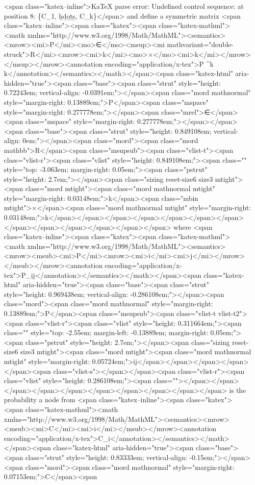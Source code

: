<span class="katex--inline">KaTeX parse error: Undefined control sequence: \hdots at position 8: \{C_1, \̲h̲d̲o̲t̲s̲, C_k\}</span> and define a symmetric matrix <span class="katex--inline"><span class="katex"><span class="katex-mathml"><math xmlns="http://www.w3.org/1998/Math/MathML"><semantics><mrow><mi>P</mi><mo>∈</mo><msup><mi mathvariant="double-struck">R</mi><mrow><mi>k</mi><mo>×</mo><mi>k</mi></mrow></msup></mrow><annotation encoding="application/x-tex">P \in {}^{k \times k}</annotation></semantics></math></span><span class="katex-html" aria-hidden="true"><span class="base"><span class="strut" style="height: 0.72243em; vertical-align: -0.0391em;"></span><span class="mord mathnormal" style="margin-right: 0.13889em;">P</span><span class="mspace" style="margin-right: 0.277778em;"></span><span class="mrel">∈</span><span class="mspace" style="margin-right: 0.277778em;"></span></span><span class="base"><span class="strut" style="height: 0.849108em; vertical-align: 0em;"></span><span class="mord"><span class="mord mathbb">R</span><span class="msupsub"><span class="vlist-t"><span class="vlist-r"><span class="vlist" style="height: 0.849108em;"><span class="" style="top: -3.063em; margin-right: 0.05em;"><span class="pstrut" style="height: 2.7em;"></span><span class="sizing reset-size6 size3 mtight"><span class="mord mtight"><span class="mord mathnormal mtight" style="margin-right: 0.03148em;">k</span><span class="mbin mtight">×</span><span class="mord mathnormal mtight" style="margin-right: 0.03148em;">k</span></span></span></span></span></span></span></span></span></span></span></span></span> where <span class="katex--inline"><span class="katex"><span class="katex-mathml"><math xmlns="http://www.w3.org/1998/Math/MathML"><semantics><mrow><msub><mi>P</mi><mrow><mi>i</mi><mi>j</mi></mrow></msub></mrow><annotation encoding="application/x-tex">P_{ij}</annotation></semantics></math></span><span class="katex-html" aria-hidden="true"><span class="base"><span class="strut" style="height: 0.969438em; vertical-align: -0.286108em;"></span><span class="mord"><span class="mord mathnormal" style="margin-right: 0.13889em;">P</span><span class="msupsub"><span class="vlist-t vlist-t2"><span class="vlist-r"><span class="vlist" style="height: 0.311664em;"><span class="" style="top: -2.55em; margin-left: -0.13889em; margin-right: 0.05em;"><span class="pstrut" style="height: 2.7em;"></span><span class="sizing reset-size6 size3 mtight"><span class="mord mtight"><span class="mord mathnormal mtight" style="margin-right: 0.05724em;">ij</span></span></span></span></span><span class="vlist-s">​</span></span><span class="vlist-r"><span class="vlist" style="height: 0.286108em;"><span class=""></span></span></span></span></span></span></span></span></span></span> is the probability a node from <span class="katex--inline"><span class="katex"><span class="katex-mathml"><math xmlns="http://www.w3.org/1998/Math/MathML"><semantics><mrow><msub><mi>C</mi><mi>i</mi></msub></mrow><annotation encoding="application/x-tex">C_i</annotation></semantics></math></span><span class="katex-html" aria-hidden="true"><span class="base"><span class="strut" style="height: 0.83333em; vertical-align: -0.15em;"></span><span class="mord"><span class="mord mathnormal" style="margin-right: 0.07153em;">C</span><span 